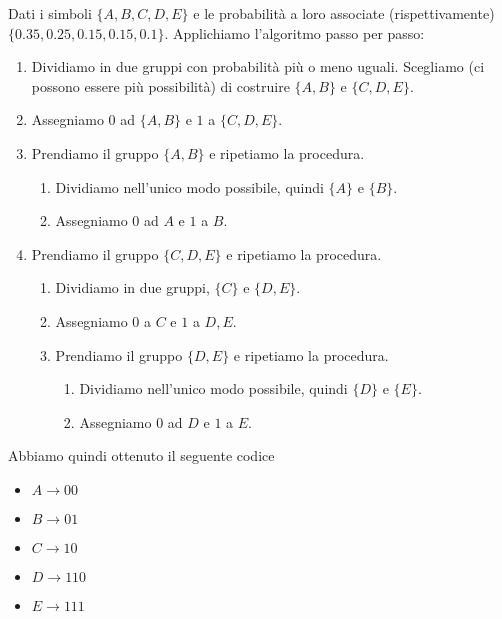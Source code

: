 \documentclass[12pt]{report}
\begin{document}
    \begin{exmp}
        Dati i simboli $\{A,B,C,D,E\}$ e le probabilità a loro associate (rispettivamente) $\{0.35,0.25,0.15,0.15,0.1\}$.
        Applichiamo l'algoritmo passo per passo:
        \begin{enumerate}
            \item Dividiamo in due gruppi con probabilità più o meno uguali. Scegliamo  (ci possono essere più possibilità) di costruire $\{A,B\}$ e $\{C,D,E\}$.
            \item Assegniamo $0$ ad $\{A,B\}$ e $1$ a $\{C,D,E\}$.
            \item Prendiamo il gruppo $\{A,B\}$ e ripetiamo la procedura.
            \begin{enumerate}
                \item Dividiamo nell'unico modo possibile, quindi $\{A\}$ e $\{B\}$.
                \item Assegniamo $0$ ad $A$ e $1$ a $B$.
            \end{enumerate}
            \item Prendiamo il gruppo $\{C,D,E\}$ e ripetiamo la procedura.
            \begin{enumerate}
                \item Dividiamo in due gruppi, $\{C\}$ e $\{D,E\}$.
                \item Assegniamo $0$ a $C$ e $1$ a $D,E$.
                \item Prendiamo il gruppo $\{D,E\}$ e ripetiamo la procedura.
                \begin{enumerate}
                    \item Dividiamo nell'unico modo possibile, quindi $\{D\}$ e $\{E\}$.
                    \item Assegniamo $0$ ad $D$ e $1$ a $E$.
                \end{enumerate}
            \end{enumerate}
        \end{enumerate}
        Abbiamo quindi ottenuto il seguente codice
        \begin{itemize}
            \item $A \rightarrow 00$
            \item $B \rightarrow 01$
            \item $C \rightarrow 10$
            \item $D \rightarrow 110$
            \item $E \rightarrow 111$
        \end{itemize}
    \end{exmp}
\end{document}
